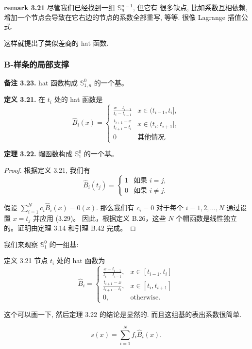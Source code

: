 \documentclass[a4paper]{ctexart}
\begin{document}
{{\bf remark 3.21}
尽管我们已经找到一组 $\mathbb{S}_{n}^{n - 1}$, 但它有
很多缺点, 比如系数互相依赖, 增加一个节点会导致在它右边的节点的系数全部重写, 等等. 
很像 Lagrange 插值公式.

这样就提出了类似差商的 hat 函数. 

\subsubsection{B-样条的局部支撑}

\noindent \textbf{备注 3.23.} hat 函数构成 $\mathbb{S}_{1, n}^0$ 的一个基。

\noindent \textbf{定义 3.21.} 在 $t_i$ 处的 hat 函数是
\[
\hat{B}_i(x) = 
\begin{cases} 
\frac{x - t_{i-1}}{t_i - t_{i-1}} & x \in (t_{i-1}, t_i], \\
\frac{t_{i+1} - x}{t_{i+1} - t_i} & x \in (t_i, t_{i+1}], \\
0 & \text{其他情况}.
\end{cases}
\tag{3.28}
\]

\noindent \textbf{定理 3.22.} 帽函数构成 $\mathbb{S}_1^0$ 的一个基。

\begin{proof}
根据定义 3.21, 我们有
\[
  \hat{B}_i(t_j) = 
  \begin{cases} 
  1 & \text{如果 } i = j, \\
  0 & \text{如果 } i \neq j.
  \end{cases}
  \tag{3.29}
\]
  
假设 $\sum_{i = 1}^{N} c_i \hat{B}_i(x) = 0(x)$. 那么我们有 $c_i = 0$ 对于每个 $i = 1, 2, \ldots, N$ 通过设置 $x = t_j$ 并应用 (3.29)。
因此，根据定义 B.26，这些 $N$ 个帽函数是线性独立的。证明由定理 3.14 和引理 B.42 完成。
\end{proof} 

我们来观察 $\mathbb{S}_1^0$ 的一组基:

定义 3.21 节点 $t_i$ 处的 hat 函数为
$$
\hat{B}_i = \left\{
\begin{array}{ll}
  \frac{x - t_{i - 1}}{t_i - t_{i - 1}}, & x \in [t_{i - 1}, t_i] \\
  \frac{t_{i + 1} - x}{t_{i + 1} - t_i}, & x \in [t_i, t_{i + 1}] \\
  0, & \mbox{otherwise.}
\end{array}
\right.
$$

这个可以画一下, 然后定理 3.22 的结论是显然的. 而且这组基的表出系数很简单.

$$
s(x) = \sum_{i = 1}^N f_i \hat{B}_i(x).
$$

}
\end{document}
